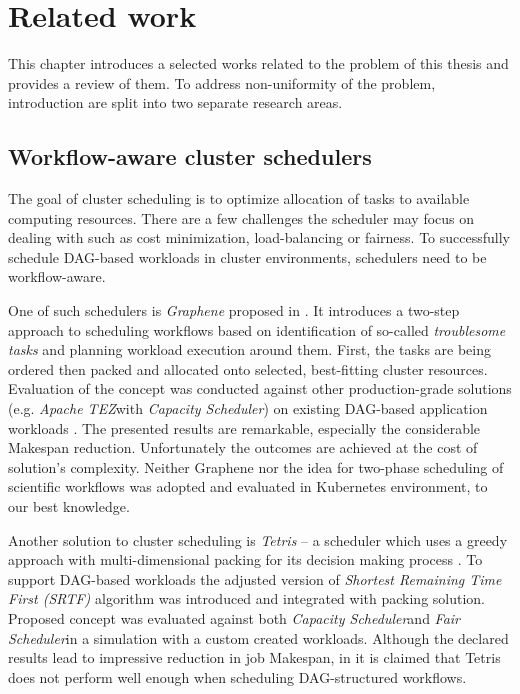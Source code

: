 \thispagestyle{only-cfoot}
\section{Related work}\label{s:RelatedWork}

This chapter introduces a selected works related to the problem of this thesis and provides a review of them.
To address non-uniformity of the problem, introduction are split into two separate research areas.



\subsection{Workflow-aware cluster schedulers}\label{s:RelatedWork:Schedulers}

The goal of cluster scheduling is to optimize allocation of tasks to available computing resources.
There are a few challenges the scheduler may focus on dealing with such as cost minimization, load-balancing or fairness.
To successfully schedule DAG-based workloads in cluster environments, schedulers need to be workflow-aware.


One of such schedulers is \emph{Graphene} proposed in \cite{b:Graphene}.
It introduces a two-step approach to scheduling workflows based on identification of so-called \emph{troublesome tasks} and planning workload execution around them.
First, the tasks are being ordered then packed and allocated onto selected, best-fitting cluster resources.
Evaluation of the concept was conducted against other production-grade solutions (e.g. \emph{Apache TEZ}\footnotemark[1]  with \emph{Capacity Scheduler}\footnotemark[2]) on existing DAG-based application workloads \cite{b:Graphene}.
The presented results are remarkable, especially the considerable Makespan reduction.
Unfortunately the outcomes are achieved at the cost of solution's complexity.
Neither Graphene nor the idea for two-phase scheduling of scientific workflows was adopted and evaluated in Kubernetes environment, to our  best knowledge.


Another solution to cluster scheduling is \emph{Tetris} -- a scheduler which uses a greedy approach with multi-dimensional packing for its decision making process \cite{b:Tetris}.
To support DAG-based workloads the adjusted version of \emph{Shortest Remaining Time First (SRTF)} algorithm was introduced and integrated with packing solution.
Proposed concept was evaluated against both \emph{Capacity Scheduler}\footnotemark[2] and \emph{Fair Scheduler}\footnotemark[3] in a simulation with a custom created workloads.
Although the declared results lead to impressive reduction in job Makespan, in \cite{b:Graphene} it is claimed that Tetris does not perform well enough when scheduling DAG-structured workflows.

